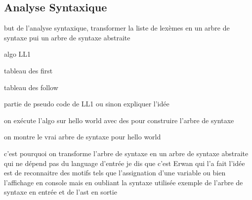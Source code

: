 \subsection{Analyse Syntaxique}

\begin{frame}
    but de l'analyse syntaxique, transformer la liste de lexèmes en un arbre de syntaxe pui un arbre de syntaxe abstraite
\end{frame}

\begin{frame}
    algo LL1
\end{frame}

\begin{frame}
    tableau des first 
\end{frame}

\begin{frame}
    tableau des follow 
\end{frame}

\begin{frame}
    partie de pseudo code de LL1 ou sinon expliquer l'idée
\end{frame}

\begin{frame}
    on exécute l'algo sur hello world avec des 
    pour construire l'arbre de syntaxe
\end{frame}


\begin{frame}
    on montre le vrai arbre de syntaxe pour hello world
\end{frame}

\begin{frame}
    c'est pourquoi on transforme l'arbre de syntaxe en un arbre de syntaxe abstraite qui ne dépend pas du language d'entrée  
    je dis que c'est Erwan qui l'a fait
    l'idée est de reconnaitre des motifs tels que l'assignation d'une variable ou bien l'affichage en console mais en oubliant la syntaxe utilisée  
    exemple de l'arbre de syntaxe en entrée et de l'ast en sortie  
\end{frame}
